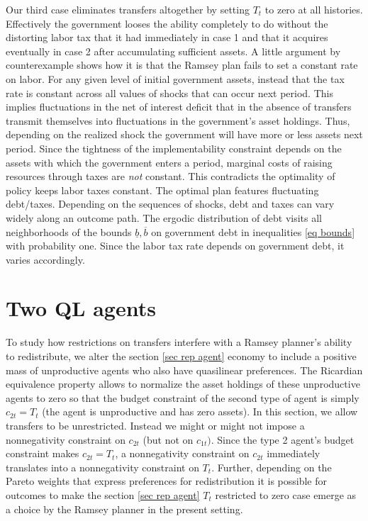 \documentclass[thmsb,11pt]{article}
\begin{document}
Our third case eliminates transfers altogether  by setting $T_t$ to zero at all histories. Effectively the government looses the ability  completely to do without the distorting labor tax that it had immediately in case 1 and that it acquires eventually in case 2 after accumulating sufficient assets.    A little argument by counterexample shows how it is that  the Ramsey plan fails to set a constant rate on labor. For any given level of initial government  assets, instead that the  tax rate is constant across all values of shocks that can occur  next period. This implies fluctuations in the net of interest deficit that in the absence of  transfers transmit themselves  into fluctuations in the government's asset holdings.
 Thus,  depending on the realized shock the government will have more or less assets  next period. Since the tightness of the implementability constraint depends on the assets with which the government enters a period, marginal costs of raising resources through taxes are \emph{not} constant. This contradicts the optimality of  policy keeps  labor taxes constant. The optimal plan features fluctuating debt/taxes.  Depending on the sequences of shocks, debt and taxes can vary widely along an outcome path. The ergodic distribution of debt visits all neighborhoods of the bounds $\underline{b},\overline{b}$ on government debt in inequalities  \eqref{eq bounds} with probability one. Since the labor tax rate  depends on government debt, it varies accordingly.


\section{Two QL agents}
To study how restrictions on transfers interfere with a Ramsey planner's ability to redistribute, 
 we  alter the section \ref{sec rep agent} economy to include a positive mass of unproductive agents who also have quasilinear preferences. The Ricardian equivalence property allows to normalize the asset holdings of these unproductive agents to zero so that   the budget constraint
  of the second type of agent is simply $c_{2t} = T_t$ (the agent is unproductive and has zero assets). In this section,
  we allow transfers to be
    unrestricted. Instead we might or might not impose a nonnegativity constraint on $c_{2t}$ (but not on $c_{1t})$.  Since the type 2 agent's budget constraint makes $c_{2t} = T_t$, a nonnegativity constraint on $c_{2t}$ immediately translates into a nonnegativity constraint on $T_t$.  
Further, depending on the Pareto weights that express preferences for redistribution it is possible for outcomes to make the
section \ref{sec rep agent}  $T_t$ restricted to zero case emerge as a choice by the Ramsey planner in the present setting.  
 
\end{document}
